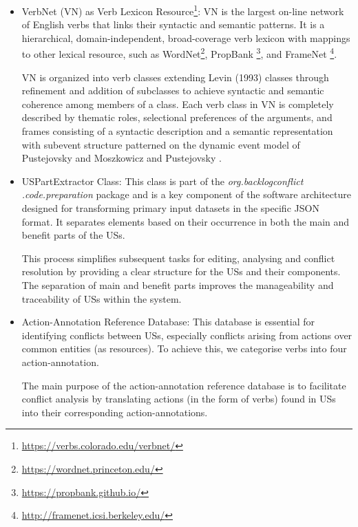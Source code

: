 \begin{itemize}
	\item VerbNet (VN) as Verb Lexicon Resource\footnote{\href{https://verbs.colorado.edu/verbnet/}{https://verbs.colorado.edu/verbnet/}}: VN is the largest on-line network of English verbs that links their syntactic and semantic patterns. It is a hierarchical, domain-independent, broad-coverage verb lexicon with mappings to other lexical resource, such as WordNet\footnote{\href{https://wordnet.princeton.edu/}{https://wordnet.princeton.edu/}}, PropBank \footnote{\href{https://propbank.github.io/}{https://propbank.github.io/}}, and FrameNet \footnote{\href{http://framenet.icsi.berkeley.edu/}{http://framenet.icsi.berkeley.edu/}}. 
	
	VN is organized into verb classes extending Levin (1993) classes through refinement and addition of subclasses to achieve syntactic and semantic coherence among members of a class. Each verb class in VN is completely described by thematic roles, selectional preferences of the arguments, and frames consisting of a syntactic description and a semantic representation with subevent structure patterned on the dynamic event model of Pustejovsky and Moszkowicz and Pustejovsky \cite{kipper2006extending}.
	
	\item USPartExtractor Class: This class is part of the \textit{org.backlogconflict .code.preparation} package and is a key component of the software architecture designed for transforming primary input datasets in the specific JSON format. It separates elements based on their occurrence in both the main and benefit parts of the USs.
	
	This process simplifies subsequent tasks for editing, analysing and conflict resolution by providing a clear structure for the USs and their components. The separation of main and benefit parts improves the manageability and traceability of USs within the system.
	
	\item Action-Annotation Reference Database: This database is essential for identifying conflicts between USs, especially conflicts arising from actions over common entities (as resources). To achieve this, we categorise verbs into four action-annotation.
	
	The main purpose of the action-annotation reference database is to facilitate conflict analysis by translating actions (in the form of verbs) found in USs into their corresponding action-annotations.
		

\end{itemize}
